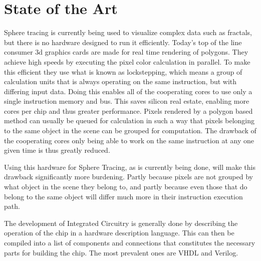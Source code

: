 \chapter{State of the Art}

Sphere tracing is currently being used to visualize complex data such as 
fractals, but there is no hardware designed to run it efficiently. Today's top 
of the line consumer 3d graphics cards are made for real time rendering of 
polygons. They achieve high speeds by executing the pixel color calculation in 
parallel. To make this efficient they use what is known as lockstepping, which 
means a group of calculation units that is always operating on the same 
instruction, but with differing input data. Doing this enables all of the 
cooperating cores to use only a single instruction memory and bus. This saves 
silicon real estate, enabling more cores per chip and thus greater performance. 
Pixels rendered by a polygon based method can usually be queued for calculation 
in such a way that pixels belonging to the same object in the scene can be 
grouped for computation. The drawback of the cooperating cores only being able 
to work on the same instruction at any one given time is thus greatly reduced.

Using this hardware for Sphere Tracing, as is currently being done, will make 
this drawback significantly more burdening. Partly because pixels are not 
grouped by what object in the scene they belong to, and partly because even 
those that do belong to the same object will differ much more in their 
instruction execution path.



The development of Integrated Circuitry is generally done by describing the 
operation of the chip in a hardware description language. This can then be 
compiled into a list of components and connections that constitutes the 
necessary parts for building the chip. The most prevalent ones are VHDL and 
Verilog. 
